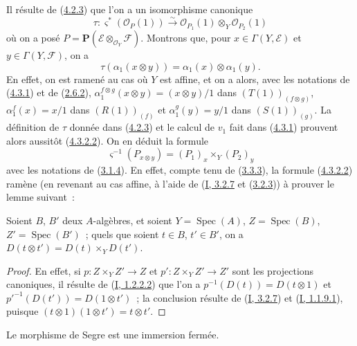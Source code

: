 \begin{env}[4.3.2]
\label{II.4.3.2-fr}
Il résulte de (\hyperref[II.4.2.3-fr]{4.2.3}) que l'on a un isomorphisme
canonique
\[
\label{II.4.3.2.1-fr}
  \tau:\varsigma^*(\mathcal{O}_P(1))\xrightarrow{\sim}
  \mathcal{O}_{P_1}(1)\otimes_Y\mathcal{O}_{P_2}(1)
\tag{4.3.2.1}
\]
où on a posé
$P=\mathbf{P}(\mathcal{E}\otimes_{\mathcal{O}_Y}\mathcal{F})$. Montrons
que, pour $x\in\Gamma(Y,\mathcal{E})$ et
$y\in\Gamma(Y,\mathcal{F})$, on a
\[
\label{II.4.3.2.2-fr}
  \tau(\alpha_1(x\otimes y))=\alpha_1(x)\otimes\alpha_1(y).
\tag{4.3.2.2}
\]
En effet, on est ramené au cas où $Y$ est affine, et on a alors, avec les
notations de (\hyperref[II.4.3.1-fr]{4.3.1}) et de
(\hyperref[II.2.6.2-fr]{2.6.2}),
$\alpha_1^{f\otimes g}(x\otimes y)=(x\otimes y)/1$ dans
$(T(1))_{(f\otimes g)}$, $\alpha_1^f(x)=x/1$ dans $(R(1))_{(f)}$ et
$\alpha_1^g(y)=y/1$ dans $(S(1))_{(g)}$. La définition de $\tau$ donnée dans
(\hyperref[II.4.2.3-fr]{4.2.3}) et le calcul de $v_1$ fait dans
(\hyperref[II.4.3.1-fr]{4.3.1}) prouvent alors aussitôt
(\hyperref[II.4.3.2.2-fr]{4.3.2.2}). On en déduit la formule
\[
\label{II.4.3.2.3-fr}
  \varsigma^{-1}(P_{x\otimes y})=(P_1)_x\times_Y(P_2)_y
\tag{4.3.2.3}
\]
avec les notations de (\hyperref[II.3.1.4-fr]{3.1.4}). En effet, compte tenu
de (\hyperref[II.3.3.3-fr]{3.3.3}), la formule
(\hyperref[II.4.3.2.2-fr]{4.3.2.2}) ramène (en revenant au cas affine, à
l'aide de (\hyperref[I.3.2.7-fr]{I, 3.2.7} et
(\hyperref[I.3.2.3-fr]{3.2.3})) à prouver le lemme suivant~:

\begin{lemma}[4.3.2.4]
\label{II.4.3.2.4-fr}
Soient $B$, $B'$ deux $A$-algèbres, et soient
$Y=\operatorname{Spec}(A)$, $Z=\operatorname{Spec}(B)$,
$Z'=\operatorname{Spec}(B')$~; quels que soient $t\in B$, $t'\in B'$, on a
$D(t\otimes t')=D(t)\times_YD(t')$.
\end{lemma}

\begin{proof}
En effet, si $p:Z\times_YZ'\to Z$ et $p':Z\times_YZ'\to Z'$ sont les
projections canoniques, il résulte de
(\hyperref[I.1.2.2.2-fr]{I, 1.2.2.2}) que l'on a
$p^{-1}(D(t))=D(t\otimes1)$ et
$p'^{-1}(D(t'))=D(1\otimes t')$~; la conclusion résulte de
(\hyperref[I.3.2.7-fr]{I, 3.2.7}) et
(\hyperref[I.1.1.9.1-fr]{I, 1.1.9.1}), puisque
$(t\otimes1)(1\otimes t')=t\otimes t'$.
\end{proof}
\end{env}

\begin{proposition}[4.3.3]
\label{II.4.3.3-fr}
Le morphisme de Segre est une immersion fermée.
\end{proposition}

